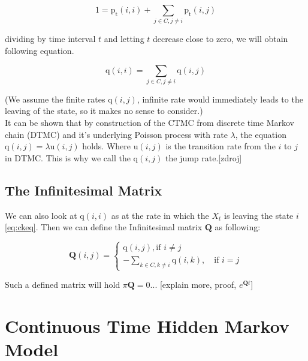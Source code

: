 \documentclass[thesis=M,english]{FITthesis}[2012/10/20]
\newcommand{\matr}[1]{\mathbf{#1}}
\begin{document}
\begin{equation}
1 = \mathrm{p_t}(i,i) + \sum_{j \in C ,j \neq i} \mathrm{p_t}(i,j) 
\end{equation}

dividing by time interval $t$ and letting $t$ decrease close to zero, we will obtain following equation. 

\begin{equation}\label{eq:qii}
 \mathrm{q}(i,i) =  \sum_{j \in C ,j \neq i} \mathrm{q}(i,j) 
\end{equation}

(We assume the finite rates $\mathrm{q}(i,j)$, infinite rate would immediately leads to the leaving of the state, so it makes no sense to consider.)\\

It can be shown that by construction of the CTMC from discrete time Markov chain (DTMC) and  it's underlying Poisson process with rate $\lambda$, the equation $\mathrm{q}(i,j) = \lambda\mathrm{u}(i,j)$ holds. Where $\mathrm{u}(i,j)$ is the transition rate from the $i$ to $j$ in DTMC. This is why we call the $\mathrm{q}(i,j)$ the jump rate.[zdroj]  


\subsection{The Infinitesimal Matrix}

We can also look at $\mathrm{q}(i,i)$ as at the rate in which the $X_t$ is leaving the state $i$ \eqref{eq:ckeq}. Then we can define the Infinitesimal matrix $\matr{Q}$ as following:

\begin{equation}  
\matr{Q}(i,j)= 
\begin{cases}
\mathrm{q}(i,j), \text{if } i\neq j\\
- \sum_{k \in C ,k \neq i} \mathrm{q}(i,k), \quad \text{if } i=j
\end{cases}
\end{equation}

Such a defined matrix will hold $\pi\matr{Q} = 0$... [explain more, proof, $e^{\matr{Q}t}$]


\section{Continuous Time Hidden Markov Model}
\end{document}
